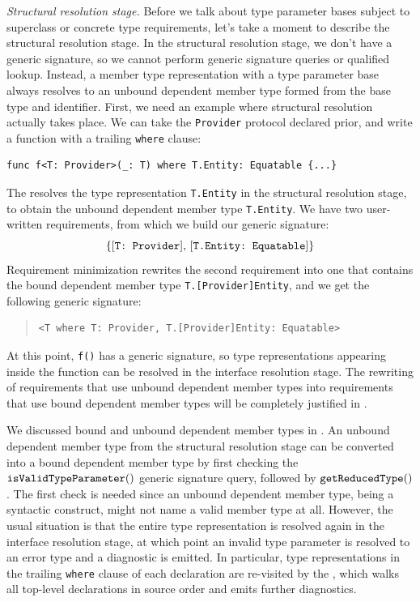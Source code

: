 \documentclass[../generics]{subfiles}
\begin{document}
\emph{Structural resolution stage.} Before we talk about type parameter bases subject to superclass or concrete type requirements, let's take a moment to describe the structural resolution stage. In the structural resolution stage, we don't have a generic signature, so we cannot perform generic signature queries or qualified lookup. Instead, a member type representation with a type parameter base always resolves to an unbound dependent member type formed from the base type and identifier. First, we need an example where structural resolution actually takes place. We can take the \texttt{Provider} protocol declared prior, and write a function with a trailing \texttt{where} clause:
\begin{Verbatim}
func f<T: Provider>(_: T) where T.Entity: Equatable {...}
\end{Verbatim}
The  resolves the type representation \texttt{T.Entity} in the structural resolution stage, to obtain the unbound dependent member type \texttt{T.Entity}. We have two user-written requirements, from which we build our generic signature:
\[\{[\texttt{T:~Provider}],\,[\texttt{T.Entity:~Equatable}]\}\]
Requirement minimization rewrites the second requirement into one that contains the bound dependent member type \texttt{T.[Provider]Entity}, and we get the following generic signature:
\begin{quote}
\begin{verbatim}
<T where T: Provider, T.[Provider]Entity: Equatable>
\end{verbatim}
\end{quote}
At this point, \texttt{f()} has a generic signature, so type representations appearing inside the function can be resolved in the interface resolution stage. The rewriting of requirements that use unbound dependent member types into requirements that use bound dependent member types will be completely justified in .

We discussed bound and unbound dependent member types in . An unbound dependent member type from the structural resolution stage can be converted into a bound dependent member type by first checking the $\texttt{isValidTypeParameter}()$ generic signature query, followed by $\texttt{getReducedType}()$. The first check is needed since an unbound dependent member type, being a syntactic construct, might not name a valid member type at all. However, the usual situation is that the entire type representation is resolved again in the interface resolution stage, at which point an invalid type parameter is resolved to an error type and a diagnostic is emitted. In particular, type representations in the trailing \texttt{where} clause of each declaration are re-visited by the , which walks all top-level declarations in source order and emits further diagnostics.
\end{document}
